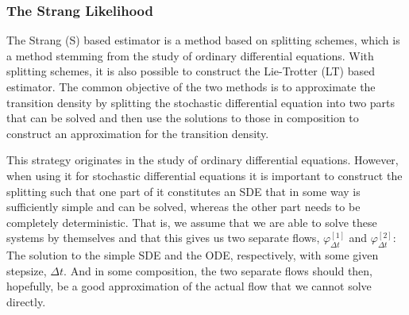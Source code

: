 \subsubsection{The Strang Likelihood}
The Strang (S) based estimator is a method based on splitting schemes, which is a method stemming from the study of ordinary differential equations. With splitting schemes, it is also possible to construct the Lie-Trotter (LT) based estimator. The common objective of the two methods is to approximate the transition density by splitting the stochastic differential equation into two parts that can be solved and then use the solutions to those in composition to construct an approximation for the transition density.

This strategy originates in the study of ordinary differential equations. However, when using it for stochastic differential equations it is important to construct the splitting such that one part of it constitutes an SDE that in some way is sufficiently simple and can be solved, whereas the other part needs to be completely deterministic. That is, we assume that we are able to solve these systems by themselves and that this gives us two separate flows, $\varphi_{\Delta t}^{[1]}$ and $\varphi_{\Delta t}^{[2]}$: The solution to the simple SDE and the ODE, respectively, with some given stepsize, $\Delta t$. And in some composition, the two separate flows should then, hopefully, be a good approximation of the actual flow that we cannot solve directly.

